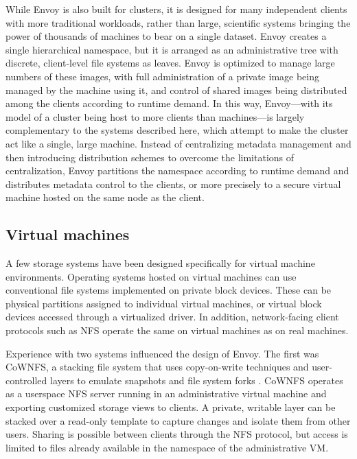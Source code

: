 While Envoy is also built for clusters, it is designed for many independent clients with more traditional workloads, rather than large, scientific systems bringing the power of thousands of machines to bear on a single dataset. Envoy creates a single hierarchical namespace, but it is arranged as an administrative tree with discrete, client-level file systems as leaves. Envoy is optimized to manage large numbers of these images, with full administration of a private image being managed by the machine using it, and control of shared images being distributed among the clients according to runtime demand. In this way, Envoy---with its model of a cluster being host to more clients than machines---is largely complementary to the systems described here, which attempt to make the cluster act like a single, large machine. Instead of centralizing metadata management and then introducing distribution schemes to overcome the limitations of centralization, Envoy partitions the namespace according to runtime demand and distributes metadata control to the clients, or more precisely to a secure virtual machine hosted on the same node as the client.

\subsection{Virtual machines}

A few storage systems have been designed specifically for virtual machine environments. Operating systems hosted on virtual machines can use conventional file systems implemented on private block devices. These can be physical partitions assigned to individual virtual machines, or virtual block devices accessed through a virtualized driver. In addition, network-facing client protocols such as NFS operate the same on virtual machines as on real machines.

Experience with two systems influenced the design of Envoy. The first was CoWNFS, a stacking file system that uses copy-on-write techniques and user-controlled layers to emulate snapshots and file system forks \cite{kotsovinos04b}. CoWNFS operates as a userspace NFS server running in an administrative virtual machine and exporting customized storage views to clients. A private, writable layer can be stacked over a read-only template to capture changes and isolate them from other users. Sharing is possible between clients through the NFS protocol, but access is limited to files already available in the namespace of the administrative VM.

